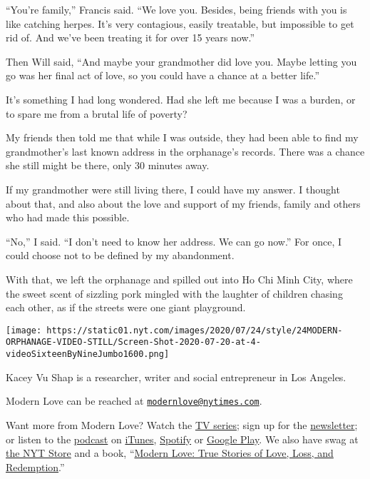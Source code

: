 ``You're family,'' Francis said. ``We love you. Besides, being friends
with you is like catching herpes. It's very contagious, easily
treatable, but impossible to get rid of. And we've been treating it for
over 15 years now.''

Then Will said, ``And maybe your grandmother did love you. Maybe letting
you go was her final act of love, so you could have a chance at a better
life.''

It's something I had long wondered. Had she left me because I was a
burden, or to spare me from a brutal life of poverty?

My friends then told me that while I was outside, they had been able to
find my grandmother's last known address in the orphanage's records.
There was a chance she still might be there, only 30 minutes away.

If my grandmother were still living there, I could have my answer. I
thought about that, and also about the love and support of my friends,
family and others who had made this possible.

``No,'' I said. ``I don't need to know her address. We can go now.'' For
once, I could choose not to be defined by my abandonment.

With that, we left the orphanage and spilled out into Ho Chi Minh City,
where the sweet scent of sizzling pork mingled with the laughter of
children chasing each other, as if the streets were one giant
playground.

\texttt{[image: https://static01.nyt.com/images/2020/07/24/style/24MODERN-ORPHANAGE-VIDEO-STILL/Screen-Shot-2020-07-20-at-4-videoSixteenByNineJumbo1600.png]}

Kacey Vu Shap is a researcher, writer and social entrepreneur in Los
Angeles.

Modern Love can be reached at
\href{mailto:modernlove@nytimes.com}{\nolinkurl{modernlove@nytimes.com}}.

Want more from Modern Love? Watch the
\href{https://www.nytimes.com/2019/09/12/style/modern-love-tv-show-trailer.html}{TV
series}; sign up for the
\href{https://www.nytimes.com/newsletters/love-letter}{newsletter}; or
listen to the
\href{https://www.nytimes.com/column/modern-love-podcast}{podcast} on
\href{https://itunes.apple.com/us/podcast/modern-love/id1065559535?mt=2\&version=meter+at+0\&module=meter-Links\&pgtype=article\&contentId=\&mediaId=\&referrer=\&priority=true\&action=click\&contentCollection=meter-links-click}{iTunes},
\href{https://open.spotify.com/show/03Er7mSPq9IEewOgbPD3vO}{Spotify} or
\href{https://play.google.com/music/listen?u=0\#/ps/Iktqjbkz7bychbnofblw32dik64}{Google
Play}. We also have swag at
\href{https://store.nytimes.com/collections/modern-love}{the NYT Store}
and a book,
``\href{https://www.penguinrandomhouse.com/books/623036/modern-love-revised-and-updated-by-edited-by-daniel-jones-with-contributions-by-andrew-rannells-ayelet-waldman-amy-krouse-rosenthal-veronica-chambers-and-more/}{Modern
Love: True Stories of Love, Loss, and Redemption}.''

